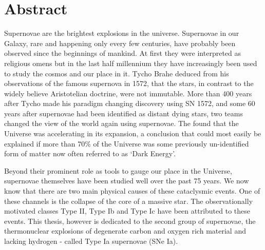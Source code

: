 \section*{Abstract}

Supernovae are the brightest explosions in the universe. Supernovae in our Galaxy, rare and happening only every few centuries, have probably been observed since the beginnings of mankind. At first they were interpreted as religious omens but in the last half millennium they have increasingly been used to study the cosmos and our place in it. Tycho Brahe deduced from his observations of the famous supernova in 1572, that the stars, in contrast to the widely believe Aristotelian doctrine, were not immutable. 
More than 400 years after Tycho made his paradigm changing discovery using SN 1572, and some 60 years after supernovae had been identified as distant dying stars, two teams changed the view of the world again using supernovae. The found that the Universe was accelerating in its expansion, a conclusion that could most easily be explained if more than 70\% of the Universe was some previously un-identified form of matter now often referred to as `Dark Energy'.

Beyond their prominent role as tools to gauge our place in the Universe, supernovae themselves have been studied well over the past 75 years. We now know that there are two main physical causes of these cataclysmic events. One of these channels is the collapse of the core of a massive star. The observationally motivated classes Type II, Type Ib and Type Ic have been attributed to these events. This thesis, however is dedicated to the second group of supernovae, the thermonuclear explosions of degenerate carbon and oxygen rich material and lacking hydrogen - called Type Ia supernovae (SNe Ia). 


